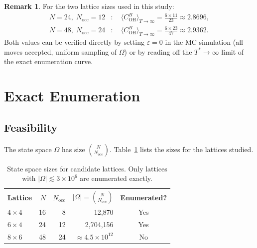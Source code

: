 \documentclass[12pt, a4paper]{article}
\theoremstyle{plain}
\theoremstyle{definition}
\newtheorem{remark}{Remark}[section]
\newcommand{\COH}{C_\mathrm{OH}^B}
\newcommand{\Nocc}{N_\mathrm{occ}}
\begin{document}
\begin{remark}
For the two lattice sizes used in this study:
\begin{align*}
    N = 24,\; \Nocc = 12 &:\quad
    \langle \COH \rangle_{T\to\infty}
    = \frac{6 \times 11}{23} \approx 2.8696, \\[4pt]
    N = 48,\; \Nocc = 24 &:\quad
    \langle \COH \rangle_{T\to\infty}
    = \frac{6 \times 23}{47} \approx 2.9362.
\end{align*}
Both values can be verified directly by setting $\varepsilon = 0$
in the MC simulation (all moves accepted, uniform sampling of
$\Omega$) or by reading off the $T^* \to \infty$ limit of the
exact enumeration curve.
\end{remark}



\section{Exact Enumeration}

\subsection{Feasibility}

The state space $\Omega$ has size $\binom{N}{\Nocc}$.
Table~\ref{tab:omega} lists the sizes for the lattices studied.

\begin{table}[H]
\centering
\caption{State space sizes for candidate lattices.
         Only lattices with $|\Omega| \lesssim 3\times10^6$
         are enumerated exactly.}
\label{tab:omega}
\begin{tabular}{lrrrc}
\toprule
Lattice & $N$ & $\Nocc$ & $|\Omega| = \binom{N}{\Nocc}$ & Enumerated? \\
\midrule
$4\times4$ & 16 & 8  & 12{,}870        & Yes \\
$6\times4$ & 24 & 12 & 2{,}704{,}156   & Yes \\
$8\times6$ & 48 & 24 & $\approx 4.5\times10^{12}$ & No \\
\bottomrule
\end{tabular}
\end{table}
\end{document}
